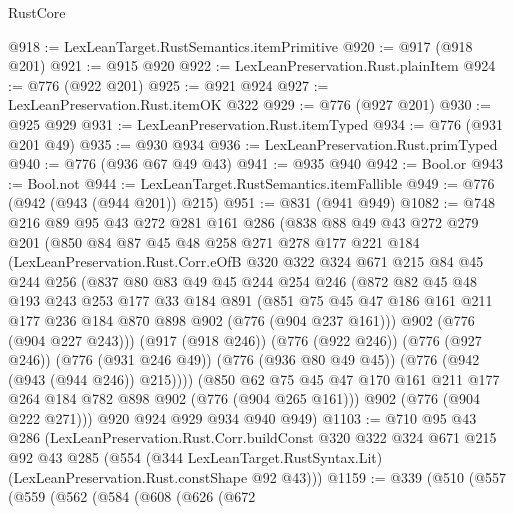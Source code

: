 \begin{lexlean}{RustCore}
\begin{coremodule}
@918 := LexLeanTarget.RustSemantics.itemPrimitive
@920 := @917 (@918 @201)
@921 := @915 @920
@922 := LexLeanPreservation.Rust.plainItem
@924 := @776 (@922 @201)
@925 := @921 @924
@927 := LexLeanPreservation.Rust.itemOK @322
@929 := @776 (@927 @201)
@930 := @925 @929
@931 := LexLeanPreservation.Rust.itemTyped
@934 := @776 (@931 @201 @49)
@935 := @930 @934
@936 := LexLeanPreservation.Rust.primTyped
@940 := @776 (@936 @67 @49 @43)
@941 := @935 @940
@942 := Bool.or
@943 := Bool.not
@944 := LexLeanTarget.RustSemantics.itemFallible
@949 := @776 (@942 (@943 (@944 @201)) @215)
@951 := @831 (@941 @949)
@1082 := @748
    @216
    @89
    @95
    @43
    @272
    @281
    @161
    @286
    (@838
      @88
      @49
      @43
      @272
      @279
      @201
      (@850
        @84
        @87
        @45
        @48
        @258
        @271
        @278
        @177
        @221
        @184
        (LexLeanPreservation.Rust.Corr.eOfB
          @320
          @322
          @324
          @671
          @215
          @84
          @45
          @244
          @256
          (@837
            @80
            @83
            @49
            @45
            @244
            @254
            @246
            (@872
              @82
              @45
              @48
              @193
              @243
              @253
              @177
              @33
              @184
              @891
              (@851
                @75
                @45
                @47
                @186
                @161
                @211
                @177
                @236
                @184
                @870
                @898
                @902
                (@776 (@904 @237 @161)))
              @902
              (@776 (@904 @227 @243)))
            (@917 (@918 @246))
            (@776 (@922 @246))
            (@776 (@927 @246))
            (@776 (@931 @246 @49))
            (@776 (@936 @80 @49 @45))
            (@776 (@942 (@943 (@944 @246)) @215))))
        (@850 @62 @75 @45 @47 @170 @161 @211 @177 @264 @184 @782 @898 @902 (@776 (@904 @265 @161)))
        @902
        (@776 (@904 @222 @271)))
      @920
      @924
      @929
      @934
      @940
      @949)
@1103 := @710
    @95
    @43
    @286
    (LexLeanPreservation.Rust.Corr.buildConst
      @320
      @322
      @324
      @671
      @215
      @92
      @43
      @285
      (@554 (@344 LexLeanTarget.RustSyntax.Lit) (LexLeanPreservation.Rust.constShape @92 @43)))
@1159 := @339
    (@510
      (@557
        (@559
          (@562
            (@584
              (@608
                (@626
                  (@672

\end{coremodule}
\end{lexlean}
